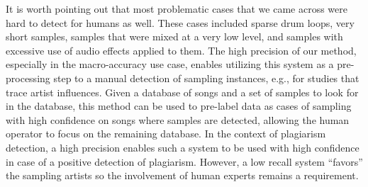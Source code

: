 \documentclass{article}
\begin{document}
It is worth pointing out that most problematic cases that we came across were hard to detect for humans as well. These cases included sparse drum loops, very short samples, samples that were mixed at a very low level, and samples with excessive use of audio effects applied to them. %
The high precision of our method, especially in the macro-accuracy use case, enables utilizing this system as a pre-processing step to a manual detection of sampling instances, e.g., for studies that trace artist influences. Given a database of songs and a set of samples to look for in the database, this method can be used to pre-label data as cases of sampling with high confidence on songs where samples are detected, allowing the human operator to focus on the remaining database. %
In the context of plagiarism detection, a high precision enables such a system to be used with high confidence in case of a positive detection of plagiarism. However, a low recall system ``favors'' the sampling artists so the involvement of human experts remains a requirement.%


\end{document}
